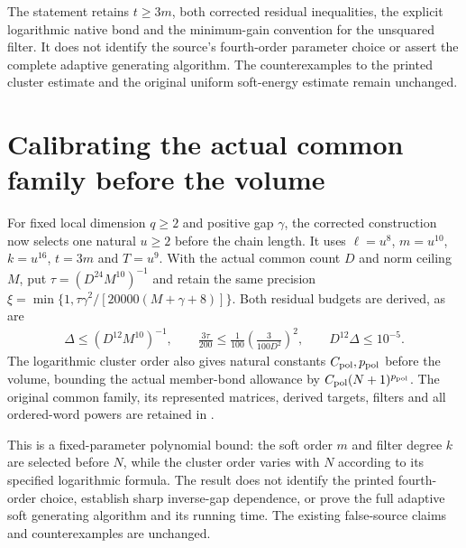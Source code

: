 \documentclass{article}
\begin{document}
The statement retains $t\ge3m$, both corrected residual inequalities,
the explicit logarithmic native bond and the minimum-gain convention for
the unsquared filter. It does not identify the source's fourth-order
parameter choice or assert the complete adaptive generating algorithm.
The counterexamples to the printed cluster estimate and the original
uniform soft-energy estimate remain unchanged.

\section{Calibrating the actual common family before the volume}

For fixed local dimension $q\ge2$ and positive gap $\gamma$, the
corrected construction now selects one natural $u\ge2$ before the
chain length. It uses $\ell=u^8$, $m=u^{10}$, $k=u^{16}$,
$t=3m$ and $T=u^9$. With the actual common count $D$ and norm ceiling
$M$, put $\tau=(D^{24}M^{10})^{-1}$ and retain the same precision
$\xi=\min\{1,\tau\gamma^2/[20000(M+\gamma+8)]\}$.
Both residual budgets are derived, as are
\begin{align}
 \Delta\le (D^{12}M^{10})^{-1},\qquad
 \frac{3\tau}{200}\le\frac1{100}
      \left(\frac{3}{100D^2}\right)^2,\qquad
 D^{12}\Delta\le10^{-5}.
\end{align}
The logarithmic cluster order also gives natural constants
$C_{\rm pol},p_{\rm pol}$ before the volume, bounding the actual
member-bond allowance by $C_{\rm pol}(N+1)^{p_{\rm pol}}$.
The original common family, its represented matrices, derived targets,
filters and all ordered-word powers are retained in
.

This is a fixed-parameter polynomial bound: the soft order $m$ and filter
degree $k$ are selected before $N$, while the cluster order varies with
$N$ according to its specified logarithmic formula. The result does not identify the printed fourth-order
choice, establish sharp inverse-gap dependence, or prove the full adaptive
soft generating algorithm and its running time. The existing false-source
claims and counterexamples are unchanged.
\end{document}
